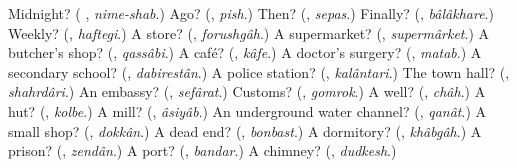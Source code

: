 \begin{tcolorbox}[breakable,colback=teal!4,colframe=teal!35!black,title={Before you move on}]
Midnight? (\textbf{ }, \emph{nime-shab}.) Ago? (\textbf{}, \emph{pish}.) Then? (\textbf{}, \emph{sepas}.) Finally? (\textbf{}, \emph{bâlâkhare}.) Weekly? (\textbf{}, \emph{haftegi}.) A store? (\textbf{}, \emph{forushgâh}.) A supermarket? (\textbf{}, \emph{supermârket}.) A butcher's shop? (\textbf{}, \emph{qassâbi}.) A café? (\textbf{}, \emph{kâfe}.) A doctor's surgery? (\textbf{}, \emph{matab}.) A secondary school? (\textbf{}, \emph{dabirestân}.) A police station? (\textbf{}, \emph{kalântari}.) The town hall? (\textbf{}, \emph{shahrdâri}.) An embassy? (\textbf{}, \emph{sefârat}.) Customs? (\textbf{}, \emph{gomrok}.) A well? (\textbf{}, \emph{châh}.) A hut? (\textbf{}, \emph{kolbe}.) A mill? (\textbf{}, \emph{âsiyâb}.) An underground water channel? (\textbf{}, \emph{qanât}.) A small shop? (\textbf{}, \emph{dokkân}.) A dead end? (\textbf{}, \emph{bonbast}.) A dormitory? (\textbf{}, \emph{khâbgâh}.) A prison? (\textbf{}, \emph{zendân}.) A port? (\textbf{}, \emph{bandar}.) A chimney? (\textbf{}, \emph{dudkesh}.)
\end{tcolorbox}
